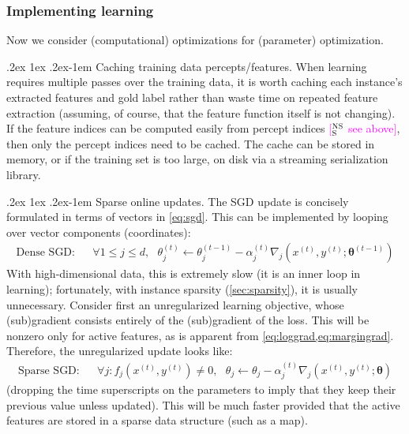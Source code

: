 \documentclass[11pt,letterpaper]{article}
\makeatletter
\newcommand{\ensuretext}[1]{#1}
\newcommand{\nssmarker}{\ensuretext{\textcolor{magenta}{\ensuremath{^{\textsc{NS}}_{\textsc{S}}}}}}
\newcommand{\arkcomment}[3]{\ensuretext{\textcolor{#3}{[#1 #2]}}}
\newcommand{\nss}[1]{\arkcomment{\nssmarker}{#1}{magenta}}
\renewcommand{\paragraph}{%
  \@startsection{paragraph}{4}%
  {\z@}{.2ex \@plus 1ex \@minus .2ex}{-1em}%
  {\normalfont\normalsize\bfseries}%
}
\makeatother
\begin{document}
\subsubsection{Implementing learning}\label{sec:impllearning}

Now we consider (computational) optimizations for (parameter) optimization.

\paragraph{Caching training data percepts/features.}
When learning requires multiple passes over the training data,
it is worth caching each instance's extracted features and gold label rather than 
waste time on repeated feature extraction (assuming, of course, that the feature function itself is not changing).
If the feature indices can be computed easily from percept indices \nss{see above}, 
then only the percept indices need to be cached.
The cache can be stored in memory, or if the training set is too large, on disk via a streaming serialization library.

\paragraph{Sparse online updates.}
The SGD update is concisely formulated in terms of vectors in \cref{eq:sgd}.
This can be implemented by looping over vector components (coordinates):
\begin{align}\label{eq:densesgd}
\textrm{Dense SGD:} & & \forall 1\leq j\leq d,~~~ \theta^{(t)}_j \leftarrow \theta^{(t-1)}_j - \alpha^{(t)}_j \nabla_j(x^{(t)},y^{(t)};\boldsymbol{\theta}^{(t-1)})
\end{align}
With high-dimensional data, this is extremely slow (it is an inner loop in learning); 
fortunately, with instance sparsity (\cref{sec:sparsity}), it is usually unnecessary.
Consider first an unregularized learning objective, whose (sub)gradient consists entirely of 
the (sub)gradient of the loss. This will be nonzero only for active features, as is apparent from \cref{eq:loggrad,eq:margingrad}.
Therefore, the unregularized update looks like:
\begin{align}\label{eq:densesgd}
\textrm{Sparse SGD:} & & \forall j: f_j(x^{(t)},y^{(t)})\neq 0,~~~ \theta_j \leftarrow \theta_j - \alpha^{(t)}_j \nabla_j(x^{(t)},y^{(t)};\boldsymbol{\theta})
\end{align}
(dropping the time superscripts on the parameters to imply that they keep their previous value unless updated).
This will be much faster provided that the active features are stored in a sparse data structure (such as a map).
\end{document}
